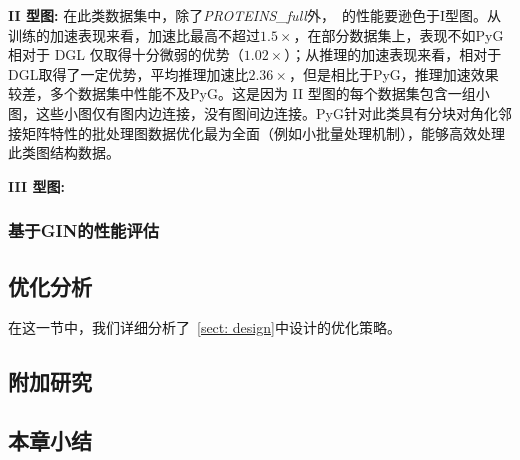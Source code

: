 \textbf{II 型图:}
在此类数据集中，除了\textit{PROTEINS_full}外，~\Mname{}的性能要逊色于I型图。从训练的加速表现来看，加速比最高不超过$1.5\times$，在部分数据集上，表现不如PyG相对于 DGL 仅取得十分微弱的优势（$1.02\times$）；从推理的加速表现来看，相对于DGL取得了一定优势，平均推理加速比$2.36\times$，但是相比于PyG，推理加速效果较差，多个数据集中性能不及PyG。这是因为 II 型图的每个数据集包含一组小图，这些小图仅有图内边连接，没有图间边连接。PyG针对此类具有分块对角化邻接矩阵特性的批处理图数据优化最为全面（例如小批量处理机制），能够高效处理此类图结构数据。

\textbf{III 型图:}






\subsubsection{基于GIN的性能评估} 




\subsection{优化分析}
在这一节中，我们详细分析了~\ref{sect: design}中设计的优化策略。
\subsection{附加研究}

\subsection{本章小结}





